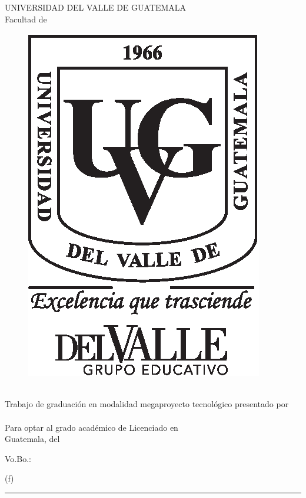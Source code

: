 \documentclass[10pt, letterpaper]{report}
\begin{document}
\ifdefined\CAPcaratula
	\newpage
	\pagecolor{white}
	\color{black}
	\setcounter{page}{1}
	\thispagestyle{empty}
	\begin{center}
		\LARGE UNIVERSIDAD DEL VALLE DE GUATEMALA\\
		\LARGE Facultad de \uvgfacultad \\[0.75cm]
	\end{center}
	\begin{figure}[h]
		\begin{center}
		\includegraphics[height=5.5 cm]{plantilla/escudoUVGnegro.eps}
		\vspace{0.5in}
		\end{center}
	\end{figure}
	\begin{center}
		\LARGE \textbf{\titulotesis} \\
		\vfill
		\vfill
		\Large Trabajo de graduación en modalidad megaproyecto tecnológico presentado por \\
		\Large \nombreestudiante \\
		\Large Para optar al grado académico de Licenciado en \uvgcarrera \\
		\vfill
		\large Guatemala, \mesentrega del \anoentrega
	\end{center}
\fi


\newpage
\thispagestyle{empty}
\mbox{}
\newpage

\ifdefined\CAPfirmas
	\newpage
	\thispagestyle{empty}
	\vspace*{0.5in}
	\large Vo.Bo.:\\[1cm]
	\begin{center}
		(f) \rule[1pt]{4 in}{1pt}\\
		\nombreasesor
	\end{center}
	\vspace{1in}
\end{document}
